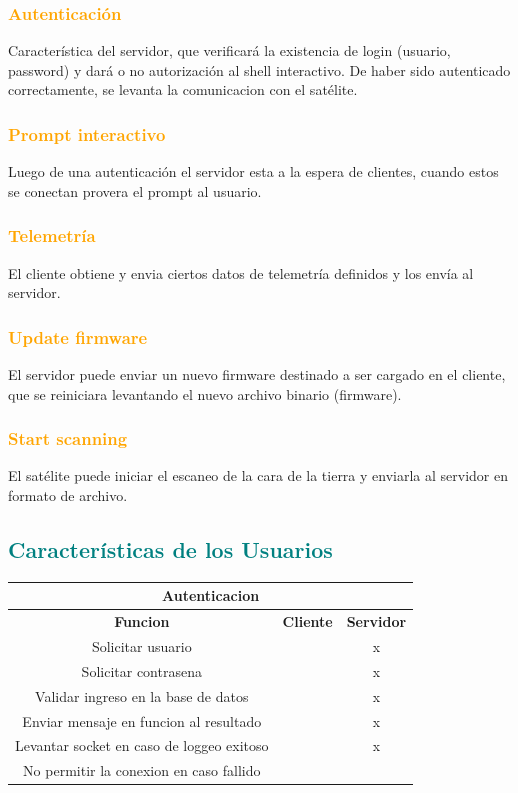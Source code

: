 \documentclass[fontsize=12pt]{article}
\begin{document}
\subsubsection{\textcolor{orange}{\textbf{Autenticación}}}
Característica del servidor, que verificará la existencia de login
(usuario, password) y dará o no autorización al shell interactivo. De haber sido autenticado correctamente,
se levanta la comunicacion con el satélite.
\subsubsection{\textcolor{orange}{\textbf{Prompt interactivo}}}
Luego de una autenticación el servidor esta a la espera de clientes, cuando
estos se conectan provera el prompt al usuario.
\subsubsection{\textcolor{orange}{\textbf{Telemetría}}}
El cliente obtiene y envia ciertos datos de telemetría definidos y los envía al servidor.
\subsubsection{\textcolor{orange}{\textbf{Update firmware}}}
El servidor puede enviar un nuevo firmware destinado a ser cargado en el cliente, que se reiniciara levantando el nuevo archivo binario (firmware).
\subsubsection{\textcolor{orange}{\textbf{Start scanning}}}
El satélite puede iniciar el escaneo de la cara de la tierra y enviarla al servidor en formato de archivo.

\subsection{\textcolor{teal}{\textbf{Características de los Usuarios}}}

\begin{table}[H]
\centering
\begin{tabular}{ |c|c|c| }
 \hline
  \multicolumn{3}{|c|}{\textbf{Autenticacion}}\\
  \hline 
\textbf{Funcion}&\textbf{Cliente} & \textbf{Servidor}\\
 \hline
 Solicitar usuario &&x\\
 Solicitar contrasena &&x\\
 Validar ingreso en la base de datos &&x\\
 Enviar mensaje en funcion al resultado &&x\\
 Levantar socket en caso de loggeo exitoso&&x\\
 No permitir la conexion en caso fallido&&\\
  \hline
\end{tabular}
\bigskip \bigskip \bigskip 
\end{table}
\end{document}
